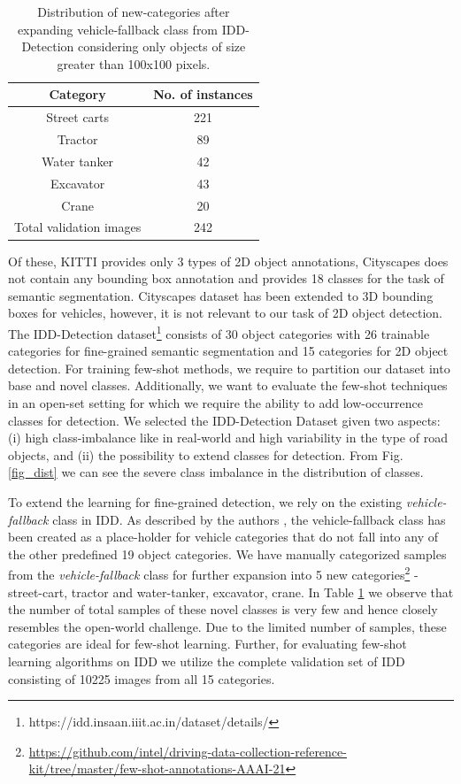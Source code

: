 \documentclass[letterpaper]{article} %
\begin{document}
\begin{table} [t]
\caption{Distribution of new-categories after expanding vehicle-fallback class from IDD-Detection considering only objects of size greater than 100x100 pixels.}
\centering
\begin{tabular}{ c | c}
\hline
Category          & No. of instances \\
\hline
Street carts      & 221 \\
Tractor           & 89 \\
Water tanker      & 42 \\
Excavator         & 43 \\
Crane             & 20 \\
\hline
Total validation images &242\footnotemark\\
\hline
\end{tabular}
\label{tableI}
\end{table}

Of these, KITTI provides only 3 types of 2D object annotations, Cityscapes does not contain any bounding box annotation and provides 18 classes for the task of semantic segmentation. Cityscapes dataset has been extended to 3D bounding boxes for vehicles, however, it is not relevant to our task of 2D object detection. The IDD-Detection dataset\footnote{https://idd.insaan.iiit.ac.in/dataset/details/} consists of 30 object categories with 26 trainable categories for fine-grained semantic segmentation and 15 categories for 2D object detection. For training few-shot methods, we require to partition our dataset into base and novel classes. Additionally, we want to evaluate the few-shot techniques in an open-set setting for which we require the ability to add low-occurrence classes for detection. We selected the IDD-Detection Dataset given two aspects: (i) high class-imbalance like in real-world and high variability in the type of road objects, and (ii) the possibility to extend classes for detection. From Fig. \ref{fig_dist} we can see the severe class imbalance in the distribution of classes.

To extend the learning for fine-grained detection, we rely on the existing  \emph{vehicle-fallback} class in IDD. As described by the authors \cite{idd}, the vehicle-fallback class has been created as a place-holder for vehicle categories that do not fall into any of the other predefined 19 object categories. We have manually categorized samples from the \emph{vehicle-fallback} class for further expansion into 5 new categories\footnote{\url{https://github.com/intel/driving-data-collection-reference-kit/tree/master/few-shot-annotations-AAAI-21}} -  street-cart, tractor and water-tanker, excavator, crane. In Table \ref{tableI} we observe that the number of total samples of these novel classes is very few and hence closely resembles the open-world challenge. Due to the limited number of samples, these categories are ideal for few-shot learning. Further, for evaluating few-shot learning algorithms on IDD we utilize the complete validation set of IDD consisting of 10225 images from all 15 categories.
\end{document}
